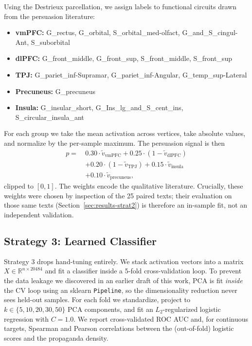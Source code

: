 \documentclass[11pt]{article}
\begin{document}
Using the Destrieux parcellation, we assign labels to functional circuits drawn from the persuasion literature:
\begin{itemize}
    \item \textbf{vmPFC:} G\_rectus, G\_orbital, S\_orbital\_med-olfact, G\_and\_S\_cingul-Ant, S\_suborbital
    \item \textbf{dlPFC:} G\_front\_middle, G\_front\_sup, S\_front\_middle, S\_front\_sup
    \item \textbf{TPJ:} G\_pariet\_inf-Supramar, G\_pariet\_inf-Angular, G\_temp\_sup-Lateral
    \item \textbf{Precuneus:} G\_precuneus
    \item \textbf{Insula:} G\_insular\_short, G\_Ins\_lg\_and\_S\_cent\_ins, S\_circular\_insula\_ant
\end{itemize}
For each group we take the mean activation across vertices, take absolute values, and normalize by the per-sample maximum. The persuasion signal is then
\begin{equation}
\begin{split}
    p =\ & 0.30 \cdot \tilde{v}_{\text{vmPFC}} + 0.25 \cdot (1 - \tilde{v}_{\text{dlPFC}}) \\
         & + 0.20 \cdot (1 - \tilde{v}_{\text{TPJ}}) + 0.15 \cdot \tilde{v}_{\text{insula}} \\
         & + 0.10 \cdot \tilde{v}_{\text{precuneus}},
\end{split}
\end{equation}
clipped to $[0,1]$. The weights encode the qualitative literature. Crucially, these weights were chosen by inspection of the 25 paired texts; their evaluation on those same texts (Section~\ref{sec:results-strat2}) is therefore an in-sample fit, not an independent validation.

\subsection{Strategy 3: Learned Classifier}

Strategy 3 drops hand-tuning entirely. We stack activation vectors into a matrix $X \in \mathbb{R}^{n \times 20484}$ and fit a classifier inside a 5-fold cross-validation loop. To prevent the data leakage we discovered in an earlier draft of this work, PCA is fit \emph{inside} the CV loop using an sklearn \texttt{Pipeline}, so the dimensionality reduction never sees held-out samples. For each fold we standardize, project to $k \in \{5, 10, 20, 30, 50\}$ PCA components, and fit an $L_2$-regularized logistic regression with $C=1.0$. We report cross-validated ROC AUC and, for continuous targets, Spearman and Pearson correlations between the (out-of-fold) logistic scores and the propaganda density.
\end{document}
